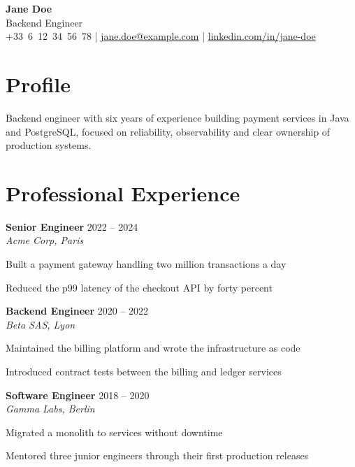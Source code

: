 \documentclass[10pt]{extarticle}
\newcommand{\role}[3]{%
  \textbf{#1} \hfill {\color{soft}\small #3}\\[-1pt]
  {\itshape\small #2}\par
}
\begin{document}
\begin{center}
    {\fontsize{18}{18}\selectfont\bfseries\color{accent} Jane Doe}\\[3pt]
    {\normalsize\color{soft} Backend Engineer}\\[4pt]
    {\footnotesize
      +33~6~12~34~56~78 \quad|\quad
      \href{mailto:jane.doe@example.com}{jane.doe@example.com} \quad|\quad
      \href{https://www.linkedin.com/in/jane-doe}{linkedin.com/in/jane-doe}
    }
\end{center}
\vspace{-9pt}

\section{Profile}

Backend engineer with six years of experience building payment services in Java and PostgreSQL, focused on reliability, observability and clear ownership of production systems.

\section{Professional Experience}

\role{Senior Engineer}{Acme Corp, Paris}{2022 – 2024}

\begin{tightlist}
    \item Built a payment gateway handling two million transactions a day

    \item Reduced the p99 latency of the checkout API by forty percent

\end{tightlist}

\role{Backend Engineer}{Beta SAS, Lyon}{2020 – 2022}

\begin{tightlist}
    \item Maintained the billing platform and wrote the infrastructure as code

    \item Introduced contract tests between the billing and ledger services

\end{tightlist}

\role{Software Engineer}{Gamma Labs, Berlin}{2018 – 2020}

\begin{tightlist}
    \item Migrated a monolith to services without downtime

    \item Mentored three junior engineers through their first production releases

\end{tightlist}
\end{document}
